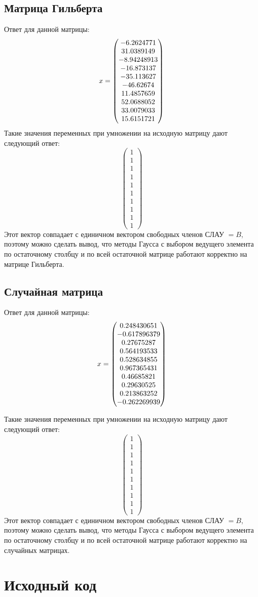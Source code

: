 \documentclass[../../report.tex]{subfiles}
\begin{document}
\subsection{Матрица Гильберта}
Ответ для данной матрицы:
\[
x = \begin{pmatrix} -6.2624771 \\ 31.0389149 \\ -8.94248913 \\ -16.873137 \\ -35.113627 \\ -46.62674 \\ 11.4857659 \\ 52.0688052 \\ 33.0079033 \\ 15.6151721 \end{pmatrix}
\]
Такие значения переменных при умножении на исходную матрицу дают следующий ответ:
\[
\begin{pmatrix}
1 \\
1 \\
1 \\
1 \\
1 \\
1 \\
1 \\
1 \\
1 \\
1
\end{pmatrix}
\]
Этот вектор совпадает с единичном вектором свободных членов СЛАУ $= B$, поэтому можно сделать вывод, что методы Гаусса с выбором ведущего элемента по остаточному столбцу и по всей остаточной матрице работают корректно на матрице Гильберта.

\subsection{Случайная матрица}
Ответ для данной матрицы:
\[
x = \begin{pmatrix} 0.248430651 \\ -0.617896379 \\ 0.27675287 \\ 0.564193533 \\ 0.528634855 \\ 0.967365431 \\ 0.46685821 \\ 0.29630525 \\ 0.213863252 \\ -0.262269939 \end{pmatrix}
\]

Такие значения переменных при умножении на исходную матрицу дают следующий ответ:
\[
\begin{pmatrix}
1 \\
1 \\
1 \\
1 \\
1 \\
1 \\
1 \\
1 \\
1 \\
1
\end{pmatrix}
\]
Этот вектор совпадает с единичном вектором свободных членов СЛАУ $= B$, поэтому можно сделать вывод, что методы Гаусса с выбором ведущего элемента по остаточному столбцу и по всей остаточной матрице работают корректно на случайных матрицах.

\section{Исходный код}
\end{document}
